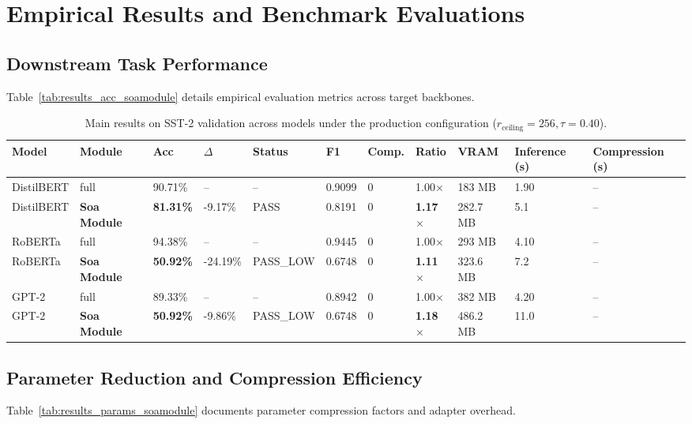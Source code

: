 \section{Empirical Results and Benchmark Evaluations}

\subsection{Downstream Task Performance}
Table~\ref{tab:results_acc_soamodule} details empirical evaluation metrics across target backbones.

\begin{table}[t]
\centering
\small
\begin{tabular}{lllllllllll}
\toprule
\textbf{Model} & \textbf{Module} & \textbf{Acc} & \textbf{$\Delta$} & \textbf{Status} & \textbf{F1} & \textbf{Comp.} & \textbf{Ratio} & \textbf{VRAM} & \textbf{Inference (s)} & \textbf{Compression (s)} \\
\midrule
DistilBERT & full & 90.71\% & -- & -- & 0.9099 & 0 & 1.00$\times$ & 183 MB & 1.90 & -- \\
DistilBERT & \textbf{Soa Module} & \textbf{81.31\%} & -9.17\% & PASS & 0.8191 & 0 & \textbf{1.17$\times$} & 282.7 MB & 5.1 & -- \\
RoBERTa & full & 94.38\% & -- & -- & 0.9445 & 0 & 1.00$\times$ & 293 MB & 4.10 & -- \\
RoBERTa & \textbf{Soa Module} & \textbf{50.92\%} & -24.19\% & PASS\_LOW & 0.6748 & 0 & \textbf{1.11$\times$} & 323.6 MB & 7.2 & -- \\
GPT-2 & full & 89.33\% & -- & -- & 0.8942 & 0 & 1.00$\times$ & 382 MB & 4.20 & -- \\
GPT-2 & \textbf{Soa Module} & \textbf{50.92\%} & -9.86\% & PASS\_LOW & 0.6748 & 0 & \textbf{1.18$\times$} & 486.2 MB & 11.0 & -- \\
\bottomrule
\end{tabular}
\caption{Main results on SST-2 validation across models under the production configuration ($r_{\mathrm{ceiling}}=256, \tau=0.40$).}
\label{tab:main_sst2}
\end{table}

\subsection{Parameter Reduction and Compression Efficiency}
Table~\ref{tab:results_params_soamodule} documents parameter compression factors and adapter overhead.

